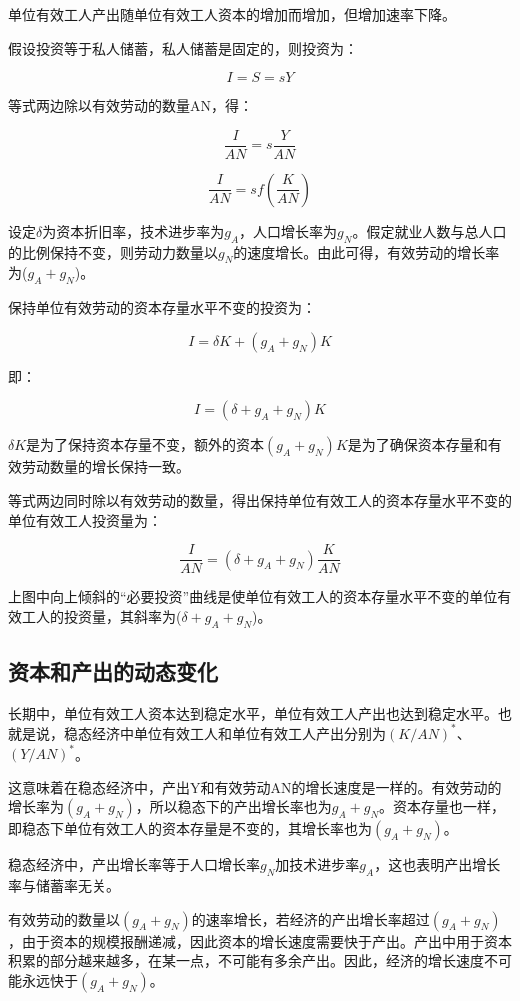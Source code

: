 \documentclass{article}
\begin{document}
单位有效工人产出随单位有效工人资本的增加而增加，但增加速率下降。

假设投资等于私人储蓄，私人储蓄是固定的，则投资为：

\[
I=S=sY
\]

等式两边除以有效劳动的数量AN，得：

\[
\frac{I}{AN}=s\frac{Y}{AN}
\]

\[
\frac{I}{AN}=sf(\frac{K}{AN})
\]

设定$\delta$为资本折旧率，技术进步率为$ g_A $，人口增长率为$ g_N $。假定就业人数与总人口的比例保持不变，则劳动力数量以$ g_N $的速度增长。由此可得，有效劳动的增长率为($ g_A+g_N $)。

保持单位有效劳动的资本存量水平不变的投资为：

\[
I=\delta K+(g_A+g_N)K
\]

即：

\[
I=(\delta+g_A+g_N)K
\]

$\delta K$是为了保持资本存量不变，额外的资本$ (g_A+g_N)K $是为了确保资本存量和有效劳动数量的增长保持一致。

等式两边同时除以有效劳动的数量，得出保持单位有效工人的资本存量水平不变的单位有效工人投资量为：

\[
\frac{I}{AN}=(\delta+g_A+g_N)\frac{K}{AN}
\]

上图中向上倾斜的“必要投资”曲线是使单位有效工人的资本存量水平不变的单位有效工人的投资量，其斜率为($ \delta+g_A+g_N $)。

\subsection{资本和产出的动态变化}

长期中，单位有效工人资本达到稳定水平，单位有效工人产出也达到稳定水平。也就是说，稳态经济中单位有效工人和单位有效工人产出分别为$ (K/AN)^* $、$ (Y/AN)^* $。

这意味着在稳态经济中，产出Y和有效劳动AN的增长速度是一样的。有效劳动的增长率为$ (g_A+g_N) $，所以稳态下的产出增长率也为$ g_A+g_N $。资本存量也一样，即稳态下单位有效工人的资本存量是不变的，其增长率也为$ (g_A+g_N) $。

稳态经济中，产出增长率等于人口增长率$ g_N $加技术进步率$ g_A $，这也表明产出增长率与储蓄率无关。

有效劳动的数量以$ (g_A+g_N) $的速率增长，若经济的产出增长率超过$ (g_A+g_N) $，由于资本的规模报酬递减，因此资本的增长速度需要快于产出。产出中用于资本积累的部分越来越多，在某一点，不可能有多余产出。因此，经济的增长速度不可能永远快于$ (g_A+g_N) $。
\end{document}
